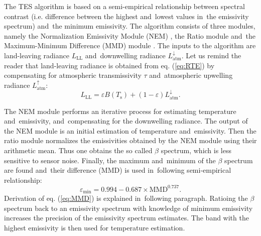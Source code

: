 The TES algorithm is based on a semi-empirical relationship between spectral contrast (i.e. difference between the highest and~lowest values in~the emissivity spectrum) and~the minimum emissivity. The algorithm consists of three modules, namely the Normalization Emissivity Module (NEM) \cite{G86}, the Ratio module and~the Maximum-Minimum Difference (MMD) module \cite{M94}. The inputs to the algorithm are land-leaving radiance $L_\mathrm{LL}$ and~downwelling radiance $L^{\downarrow}_\mathrm{atm}$. Let us remind the reader that land-leaving radiance is obtained from eq. (\ref{eq:RTE}) by compensating for atmospheric transmissivity $\tau$ and~atmospheric upwelling radiance $L^{\uparrow}_\mathrm{atm}$:
\begin{equation}
\label{eq:landleavingRadiance}
L_\mathrm{LL} = \varepsilon B(T_\mathrm{s}) + (1 - \varepsilon) L^\downarrow_\mathrm{atm}.
\end{equation}

The NEM module performs an iterative process for estimating temperature and~emissivity, and~compensating for the downwelling radiance. The output of the NEM module is an initial estimation of temperature and~emissivity. Then the ratio module normalizes the emissivities obtained by the NEM module using their arithmetic mean. Thus one obtains the so called $\beta$ spectrum, which is less sensitive to sensor noise. Finally, the maximum and~minimum of the $\beta$ spectrum are found and~their difference (MMD) is used in~following semi-empirical relationship:
\begin{equation} 
\label{eq:MMD}
\varepsilon_\mathrm{min} = 0.994 - 0.687 \times \mathrm{MMD}^{0.737}. 
\end{equation}
Derivation of eq. (\ref{eq:MMD}) is explained in~following paragraph. Ratioing the $\beta$ spectrum back to an emissivity spectrum with knowledge of minimum emissivity increases the precision of the emissivity spectrum estimates. The band with the highest emissivity is then used for temperature estimation.

